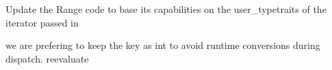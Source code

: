 
\begin{DoxyRefList}
\item[Class \mbox{\hyperlink{structchaiscript_1_1bootstrap_1_1standard__library_1_1Bidir__Range}{chaiscript\+::bootstrap\+::standard\+\_\+library\+::Bidir\+\_\+\+Range$<$ Container, Iter\+Type $>$}} ]\label{todo__todo000001}%
%
Update the Range code to base its capabilities on the user\+\_\+typetraits of the iterator passed in  
\item[Member \mbox{\hyperlink{bootstrap__stl_8hpp_a79ad40d2c8f924f12cb33ae5b20145c4}{chaiscript\+::bootstrap\+::standard\+\_\+library\+::random\+\_\+access\+\_\+container\+\_\+type}} (const std\+::string \&, \mbox{\hyperlink{classchaiscript_1_1Module}{Module}} \&m)]\label{todo__todo000002}%
%
we are prefering to keep the key as \textquotesingle{}int\textquotesingle{} to avoid runtime conversions during dispatch. reevaluate 


\end{DoxyRefList}
